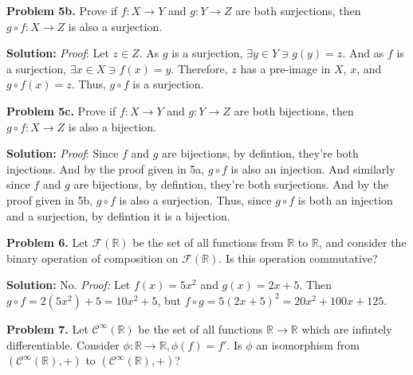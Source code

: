 \documentclass[12pt, letterpaper]{article}
\newenvironment{problem}
    [1]
    {\noindent \textbf{Problem #1.}}
    {\vspace{3mm}}
\newenvironment{solution}
    [0]
    {\noindent \textbf{Solution:}} 
    {\vspace{3mm}}
\begin{document}
    \begin{problem}{5b}
        Prove if $f:X \rightarrow Y$ and $g: Y \rightarrow Z$ are both surjections,
        then $g \circ f: X \rightarrow Z$ is also a surjection.
    \end{problem}

    \begin{solution}
        \emph{Proof}: Let $z \in Z$. As $g$ is a surjection, $\exists y \in Y \ni g(y)=z$.
        And as $f$ is a surjection, $\exists x \in X \ni f(x)=y$. Therefore, $z$ has a 
        pre-image in $X$, $x$, and $g \circ f(x)=z$. Thus, $g \circ f$ is a surjection.
    \end{solution}

    \begin{problem}{5c}
        Prove if $f:X \rightarrow Y$ and $g: Y \rightarrow Z$ are both bijections,
        then $g \circ f: X \rightarrow Z$ is also a bijection.
    \end{problem}

    \begin{solution}
        \emph{Proof}: Since $f$ and $g$ are bijections, by defintion, they're both
        injections. And by the proof given in 5a, $g \circ f$ is also an injection.
        And similarly since $f$ and $g$ are bijections, by defintion, they're both
        surjections. And by the proof given in 5b, $g \circ f$ is also a surjection.
        Thus, since $g \circ f$ is both an injection and a surjection, by defintion
        it is a bijection.
    \end{solution}

    \begin{problem}{6}
        Let $\mathcal{F}(\mathbb{R})$ be the set of all functions from $\mathbb{R}$ to 
        $\mathbb{R}$, and consider the binary operation of composition on
        $\mathcal{F}(\mathbb{R})$. Is this operation commutative?
    \end{problem}

    \begin{solution}
        No. \emph{Proof:} Let $f(x)=5x^2$ and $g(x)=2x+5$. Then $g \circ f = 2(5x^2)+5 = 
        10x^2 + 5$, but $f \circ g = 5(2x+5)^2 = 20x^2+100x+125$.
    \end{solution}

    \begin{problem}{7}
        Let $\mathcal{C}^\infty(\mathbb{R})$ be the set of all functions
        $\mathbb{R} \rightarrow \mathbb{R}$ which are infintely differentiable.
        Consider $\phi: \mathbb{R} \rightarrow \mathbb{R}, \phi(f) = f'$. Is
        $\phi$ an isomorphism from $(\mathcal{C}^\infty(\mathbb{R}), +)$ to
        $(\mathcal{C}^\infty(\mathbb{R}), +)$?
    \end{problem}
\end{document}
